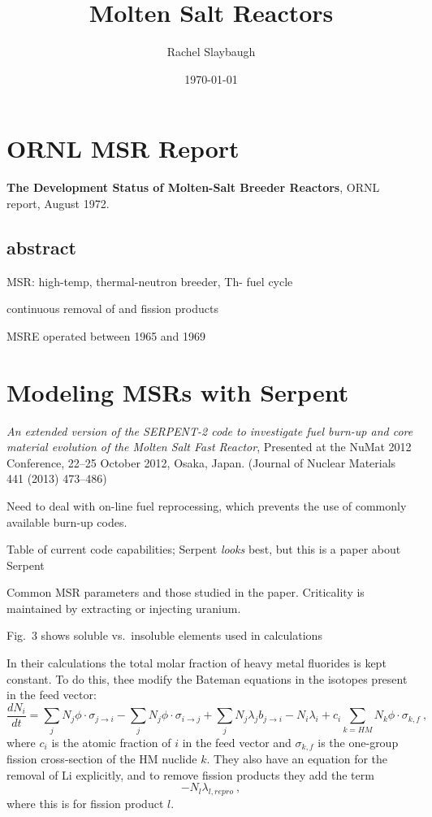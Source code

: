 \documentclass[12pt,twoside]{article}
\date{\today}
\title{Molten Salt Reactors}
\author{Rachel Slaybaugh}
\begin{document}
\maketitle

\section*{ORNL MSR Report}
\textbf{The Development Status of Molten-Salt Breeder Reactors}, ORNL report,
August 1972.

\subsection*{abstract}
\begin{compactitem}
\item MSR: high-temp, thermal-neutron breeder, Th- fuel cycle
\item continuous removal of  and fission products
\item MSRE operated between 1965 and 1969
\end{compactitem}


\section*{Modeling MSRs with Serpent}
\textit{An extended version of the SERPENT-2 code to investigate fuel burn-up
and core material evolution of the Molten Salt Fast Reactor}, Presented at the
NuMat 2012 Conference, 22–25 October 2012, Osaka, Japan. (Journal of Nuclear 
Materials 441 (2013) 473--486)

\begin{compactitem}
\item Need to deal with on-line fuel reprocessing, which prevents the use of
commonly available burn-up codes. 
\item Table of current code capabilities; Serpent \textit{looks} best, but this
is a paper about Serpent
\item Common MSR parameters and those studied in the paper. Criticality is
maintained by extracting or injecting uranium.
\item Fig.\ 3 shows soluble vs.\ insoluble elements used in calculations
\end{compactitem}

In their calculations the total molar fraction of heavy metal fluorides is kept
constant. To do this, thee modify the Bateman equations in the isotopes present 
in the feed vector:
\[
\frac{dN_i}{dt} = \sum_j N_j \phi \cdot \sigma_{j\rightarrow i}  - \sum_j
N_j\phi \cdot \sigma_{i \rightarrow j} + \sum_j N_j \lambda_j b_{j\rightarrow
i} - N_i \lambda_i + c_i \sum_{k=HM} N_k\phi \cdot \sigma_{k,f}\:,
\]
where $c_i$ is the atomic fraction of $i$ in the feed vector and $\sigma_{k,f}$
is the one-group fission cross-section of the HM nuclide $k$.
They also have an equation for the removal of Li explicitly, and to remove
fission products they add the term
\[
-N_l \lambda_{l,repro}\:,
\]
where this is for fission product $l$.
\end{document}
